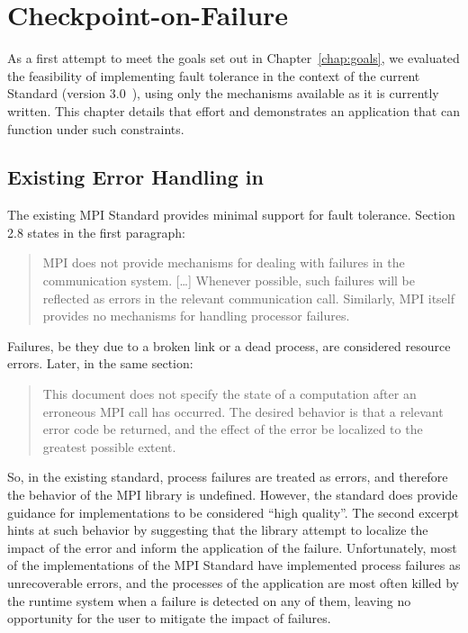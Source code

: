 \chapter{Checkpoint-on-Failure}\label{chap:cof}

As a first attempt to meet the goals set out in Chapter~\ref{chap:goals}, we
evaluated the feasibility of implementing fault tolerance in the context of the
current \mpi Standard (version 3.0~\cite{MPI30}), using only the mechanisms 
available as it is currently written. This chapter details that effort and demonstrates 
an application that can function under such constraints.

\section{Existing Error Handling in \mpi}\label{sect:cof:existing}

The existing MPI Standard provides minimal support for fault tolerance. Section
2.8 states in the first paragraph: 

\begin{quote}
MPI does not provide mechanisms for
dealing with failures in the communication system. [\ldots] Whenever possible,
such failures will be reflected as errors in the relevant communication call.
Similarly, MPI itself provides no mechanisms for handling processor failures.
\end{quote}

Failures, be they due to a broken link or a dead process, are considered
resource errors. Later, in the same section: 

\begin{quote}
This document does not
specify the state of a computation after an erroneous MPI call has occurred. The
desired behavior is that a relevant error code be returned, and the effect of
the error be localized to the greatest possible extent.
\end{quote}

So, in the existing
standard, process failures are treated as errors, and therefore the behavior of
the MPI library is undefined. However, the standard does provide guidance for
implementations to be considered ``high quality''. The second excerpt hints at
such behavior by suggesting that the library attempt to localize the impact of
the error and inform the application of the failure. Unfortunately, most of the
implementations of the MPI Standard have implemented process failures as
unrecoverable errors, and the processes of the application are most often killed
by the runtime system when a failure is detected on any of them, leaving no opportunity
for the user to mitigate the impact of failures.

